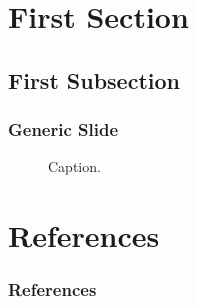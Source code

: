 \begin{frame}
\titlepage %
\end{frame}

\section{First Section}
\subsection{First Subsection}

\begin{frame}
  \frametitle{Generic Slide}
    \begin{figure}
    \caption{Caption.}
  \end{figure}
\end{frame}

\section{References}

\begin{frame}[allowframebreaks] %
\frametitle{References}


\end{frame}


